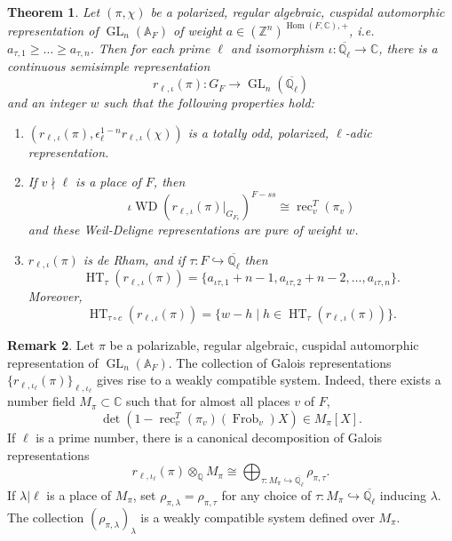 \documentclass{amsart}
\newtheorem{theorem}{Theorem}[section]
\theoremstyle{definition}
\newtheorem{remark}[theorem]{Remark}
\numberwithin{equation}{section} %
\newcommand{\GL}{\operatorname{GL}}
\newcommand{\Hom}{\operatorname{Hom}}
\newcommand{\WD}{\operatorname{WD}}
\newcommand{\rec}{\operatorname{rec}}
\newcommand{\Qlbar}{\ensuremath{\overline{\mathbb{Q}_\ell}}}
\newcommand{\Frob}{\operatorname{Frob}}
\newcommand{\HT}{\operatorname{HT}}
\newcommand{\bb}[1]{\mathbb{#1}}
\begin{document}
\begin{theorem}
    Let \( (\pi,\chi) \) be a polarized, regular algebraic, cuspidal automorphic representation of \( \GL_n(\bb{A}_F) \) of weight \( a\in (\bb{Z}^n)^{\Hom(F,\bb{C}),+} \), i.e. \( a_{\tau,1}\geq\dots\geq a_{\tau,n} \). Then for each prime \( \ell \) and isomorphism \( \iota:\Qlbar\to\bb{C} \), there is a continuous semisimple representation
    \[ r_{\ell,\iota}(\pi):G_F\to\GL_n(\Qlbar) \]
    and an integer \( w \) such that the following properties hold:
    \begin{enumerate}
        \item \( (r_{\ell,\iota}(\pi),\epsilon_\ell^{1-n}r_{\ell,\iota}(\chi)) \) is a totally odd, polarized, \( \ell \)-adic representation.
        \item If \( v\nmid \ell \) is a place of \( F \), then
        \[ \iota\WD(r_{\ell,\iota}(\pi)|_{G_{F_v}})^{F-ss}\cong \rec_v^T(\pi_v) 
        \]
        and these Weil-Deligne representations are pure of weight \( w \).
        \item \( r_{\ell,\iota}(\pi) \) is de Rham, and if \( \tau:F\hookrightarrow\Qlbar \) then
        \[ \HT_{\tau}(r_{\ell,\iota}(\pi)) = \{ a_{\iota\tau,1}+n-1,a_{\iota\tau,2}+n-2,\dots, a_{\iota\tau,n} \}. \]
        Moreover,
        \[ \HT_{\tau\circ c}(r_{\ell,\iota}(\pi)) = \{ w-h\mid h\in \HT_{\tau}(r_{\ell,\iota}(\pi)) \}. \]
    \end{enumerate}
\end{theorem}

\begin{remark} \label{rmk: automorphic Galois reps compatible systems}
    Let \( \pi \) be a polarizable, regular algebraic, cuspidal automorphic representation of \( \GL_n(\bb{A}_{F}) \). 
The collection of Galois representations \( \{ r_{\ell,\iota_\ell}(\pi) \}_{\ell,\iota_\ell} \) gives rise to a weakly compatible system.
Indeed, there exists a number field \( M_\pi\subset\bb{C} \) such that for almost all places \( v \) of \( F \),
    \[ \det(1-\rec_v^T(\pi_v)(\Frob_v)X)\in M_\pi[X]. \]
If $\ell$ is a prime number, there is a canonical decomposition of Galois representations \[r_{\ell,\iota_\ell}(\pi) \otimes_{\bb{Q}} M_\pi \cong \bigoplus_{\tau: M_\pi \hookrightarrow \Qlbar} \rho_{\pi,\tau}.\]
If $\lambda|\ell$ is a place of $M_\pi$, set $\rho_{\pi,\lambda} = \rho_{\pi,\tau}$ for any choice of $\tau: M_\pi \hookrightarrow \Qlbar$ inducing $\lambda$.
The collection $(\rho_{\pi,\lambda})_\lambda$ is a weakly compatible system defined over $M_\pi$.

\end{remark}
\end{document}
